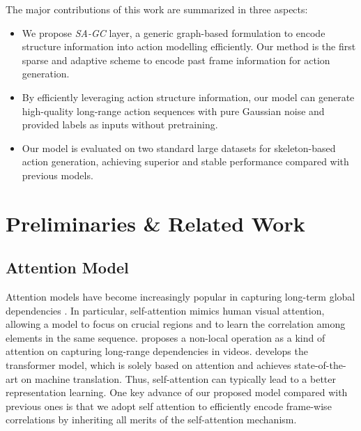 \documentclass[runningheads]{llncs}
\begin{document}
The major contributions of this work are summarized in three aspects:
\begin{itemize}
    \item We propose {\it SA-GC} layer, a generic graph-based formulation to encode structure information into action modelling efficiently. Our method is the first sparse and adaptive scheme to encode past frame information for action generation.
    \item By efficiently leveraging action structure information, our model can generate high-quality long-range action sequences with pure Gaussian noise and provided labels as inputs without pretraining. 
    \item Our model is evaluated on two standard large datasets for skeleton-based action generation, achieving superior and stable performance compared with previous models.
\end{itemize}











\section{Preliminaries \& Related Work}


\subsection{Attention Model}
Attention models have become increasingly popular in capturing long-term global dependencies \cite{bahdanau2014neural,chen2017pixelsnail}. In particular, self-attention \cite{brock2018large,vaswani2017attention,zhang2019self} mimics human visual attention, allowing a model to focus on crucial regions and to learn the correlation among elements in the same sequence. \cite{wang2018non} proposes a non-local operation as a kind of attention on capturing long-range dependencies in videos. \cite{vaswani2017attention} develops the transformer model, which is solely based on attention and achieves state-of-the-art on machine translation.  Thus, self-attention can typically lead to a better representation learning. One key advance of our proposed model compared with previous ones is that we adopt self attention to efficiently encode frame-wise correlations by inheriting all merits of the self-attention mechanism. 
\end{document}
